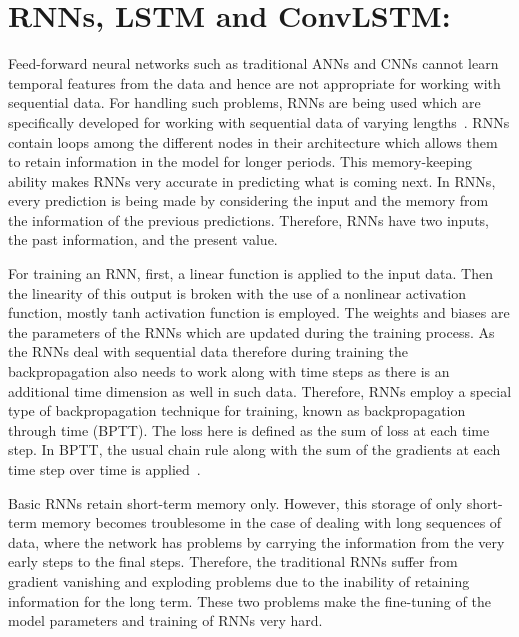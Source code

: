 \section{RNNs, LSTM and ConvLSTM:}
Feed-forward neural networks such as traditional ANNs and CNNs cannot learn temporal features from the data and hence are not appropriate for working with sequential data.
For handling such problems, RNNs are being used which are specifically developed for working with sequential data of varying lengths~\cite{aggarwal2018neural, lecun2015deep, bengio2017deep}. 
RNNs contain loops among the different nodes in their architecture which allows them to retain information in the model for longer periods.
This memory-keeping ability makes RNNs very accurate in predicting what is coming next.
In RNNs, every prediction is being made by considering the input and the memory from the information of the previous predictions.
Therefore, RNNs have two inputs, the past information, and the present value.

For training an RNN, first, a linear function is applied to the input data.
Then the linearity of this output is broken with the use of a nonlinear activation function, mostly tanh activation function is employed.
The weights and biases are the parameters of the RNNs which are updated during the training process.
As the RNNs deal with sequential data therefore during training the backpropagation also needs to work along with time steps as there is an additional time dimension as well in such data.
Therefore, RNNs employ a special type of backpropagation technique for training,
known as backpropagation through time (BPTT). 
The loss here is defined as the sum of loss at each time step. 
In BPTT, the usual chain rule along with the sum of the gradients at
each time step over time is applied~\cite{aggarwal2018neural}.

Basic RNNs retain short-term memory only.
However, this storage of only short-term memory becomes troublesome in the case of dealing with long sequences of data, where the network has problems by carrying the information from the very early steps to the final steps.
Therefore, the traditional RNNs suffer from gradient vanishing and exploding problems due to the inability of retaining information for the long term. 
These two problems make the fine-tuning of the model parameters and training of RNNs very hard.

